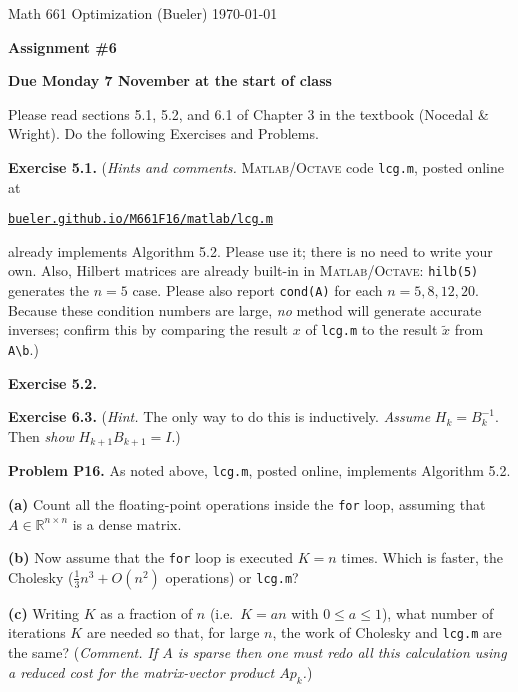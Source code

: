 \documentclass[12pt]{amsart}
\newcommand{\RR}{\mathbb{R}}
\newcommand{\Matlab}{\textsc{Matlab}\xspace}
\newcommand{\Octave}{\textsc{Octave}\xspace}
\newcommand{\prob}[1]{\medskip\noindent\textbf{#1.}\quad }
\newcommand{\exer}[1]{\prob{Exercise #1}}
\newcommand{\epart}[1]{\medskip\noindent\textbf{(#1)}\quad }
\begin{document}
\scriptsize \noindent Math 661 Optimization (Bueler) \hfill \today
\normalsize

\bigskip

\Large\centerline{\textbf{Assignment \#6}}
\large
\medskip

\centerline{\textbf{Due Monday 7 November at the start of class}}

\normalsize

\thispagestyle{empty}

\bigskip\medskip

\noindent Please read sections 5.1, 5.2, and 6.1 of Chapter 3 in the textbook (Nocedal \& Wright).  Do the following Exercises and Problems.

\bigskip

\exer{5.1}  (\emph{Hints and comments.}  \Matlab/\Octave code \texttt{lcg.m}, posted online at

\medskip

\centerline{\href{http://bueler.github.io/M661F16/matlab/lcg.m}{\texttt{bueler.github.io/M661F16/matlab/lcg.m}}}

\medskip
\noindent already implements Algorithm 5.2.  Please use it; there is no need to write your own.  Also, Hilbert matrices are already built-in in \Matlab/\Octave: \texttt{hilb(5)} generates the $n=5$ case.  Please also report \texttt{cond(A)} for each $n=5,8,12,20$.  Because these condition numbers are large, \emph{no} method will generate accurate inverses; confirm this by comparing the result $x$ of \texttt{lcg.m} to the result $\tilde x$ from \verb|A\b|.)

\exer{5.2}

\exer{6.3}  (\emph{Hint.}  The only way to do this is inductively.  \emph{Assume} $H_k = B_k^{-1}$.  Then \emph{show} $H_{k+1} B_{k+1} = I$.)

\bigskip

\prob{Problem P16}  As noted above, \texttt{lcg.m}, posted online, implements Algorithm 5.2.

\epart{a}  Count all the floating-point operations inside the \texttt{for} loop, assuming that $A\in \RR^{n\times n}$ is a dense matrix.

\epart{b}  Now assume that the \texttt{for} loop is executed $K=n$ times.  Which is faster, the Cholesky ($\frac{1}{3} n^3 + O(n^2)$ operations) or \texttt{lcg.m}?

\epart{c}  Writing $K$ as a fraction of $n$ (i.e.~$K = a n$ with $0\le a \le 1$), what number of iterations $K$ are needed so that, for large $n$, the work of Cholesky and \texttt{lcg.m} are the same?  (\emph{Comment.  If $A$ is sparse then one must redo all this calculation using a reduced cost for the matrix-vector product $A p_k$.})
\end{document}
